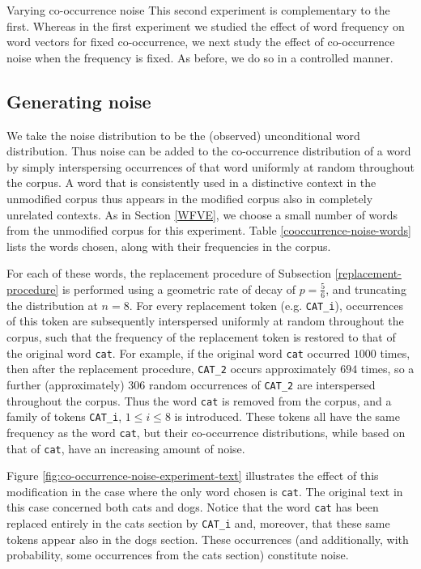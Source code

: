 \documentclass{article} %
\newcommand{\word}[1]{\texttt{#1}}
\begin{document}
\begin{section}{Varying co-occurrence noise}\label{CNVE}
This second experiment is complementary to the first.  Whereas in the
first experiment we studied the effect of word frequency on word vectors
for fixed co-occurrence, we next study the effect of co-occurrence noise when the frequency is fixed.
As before, we do so in a controlled manner.
  
\subsection{Generating noise}
We take the noise distribution to be the (observed) unconditional word distribution.
Thus noise can be added to the co-occurrence distribution of a word by simply interspersing occurrences of
that word uniformly at random throughout the corpus.  A word that is
consistently used in a distinctive context in the unmodified corpus thus
appears in the modified corpus also in completely unrelated contexts.
As in Section \ref{WFVE}, we choose a small number of words from the
unmodified corpus for this experiment.  Table
\ref{cooccurrence-noise-words} lists the words chosen, along with their
frequencies in the corpus.

For each of these words, the replacement procedure of Subsection
\ref{replacement-procedure} is performed using a geometric rate of decay
of $p = \tfrac{5}{6}$, and truncating the distribution at $n=8$.  For
every replacement token (e.g. \word{CAT\_i}), occurrences of this
token are subsequently interspersed uniformly at random throughout the
corpus, such that the frequency of the replacement token is restored to
that of the original word \word{cat}.  For example, if the original word
\word{cat} occurred $1000$ times, then after the replacement procedure,
\word{CAT\_2} occurs approximately $694$ times, so a further
(approximately) $306$ random occurrences of \word{CAT\_2} are
interspersed throughout the corpus.  Thus the word \word{cat} is removed
from the corpus, and a family of tokens \word{CAT\_i}, $1 \leqslant i
\leqslant 8$ is introduced.  These tokens all have the same frequency as
the word \word{cat}, but their co-occurrence distributions, while based
on that of \word{cat}, have an increasing amount of noise.

Figure \ref{fig:co-occurrence-noise-experiment-text} illustrates the
effect of this modification in the case where the only word chosen is
\word{cat}.  The original text in this case concerned both cats and
dogs.  Notice that the word \word{cat} has been replaced entirely in the
cats section by \word{CAT\_i} and, moreover, that these same tokens
appear also in the dogs section. These occurrences (and additionally,
with probability, some occurrences from the cats section) constitute
noise.


\end{section}
\end{document}
